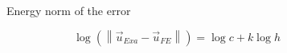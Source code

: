 \documentclass[12pt,letterpaper]{article}
\begin{document}
\begin{figure}[H]
\centering
{}
\caption{Energy norm of the error}
\label{fig:conv}
\end{figure}

\[\log \left( {\left\| {{{\vec u}_{Exa}} - {{\vec u}_{FE}}} \right\|} \right) = \log c + k\log h\]






\end{document}
